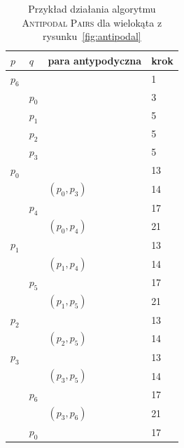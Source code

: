 \begin{table}[htb]
  \centering

  \begin{tabular}{llll}
    \toprule
    $p$ & $q$ & para antypodyczna & krok \\
    \midrule
    $p_6$ & & & 1 \\
    \midrule
    & $p_0$ & & 3 \\
    \midrule
    & $p_1$ & & 5 \\
    \midrule
    & $p_2$ & & 5 \\
    \midrule
    & $p_3$ & & 5 \\
    \midrule
    $p_0$& & & 13 \\
    \midrule
    & & $(p_0, p_3)$ & 14 \\
    \midrule
    & $p_4$ & & 17 \\
    \midrule
    & & $(p_0, p_4)$ & 21 \\
    \midrule
    $p_1$& & & 13 \\
    \midrule
    & & $(p_1, p_4)$ & 14 \\
    \midrule
    & $p_5$ & & 17 \\
    \midrule
    & & $(p_1, p_5)$ & 21 \\
    \midrule
    $p_2$& & & 13 \\
    \midrule
    & & $(p_2, p_5)$ & 14 \\
    \midrule
    $p_3$& & & 13 \\
    \midrule
    & & $(p_3, p_5)$ & 14 \\
    \midrule
    & $p_6$ & & 17 \\
    \midrule
    & & $(p_3, p_6)$ & 21 \\
    \midrule
    & $p_0$ & & 17 \\
    \bottomrule
  \end{tabular}

  \caption{Przykład działania algorytmu  \textsc{Antipodal Pairs} dla
    wielokąta z rysunku~\ref{fig:antipodal}}
\end{table}


